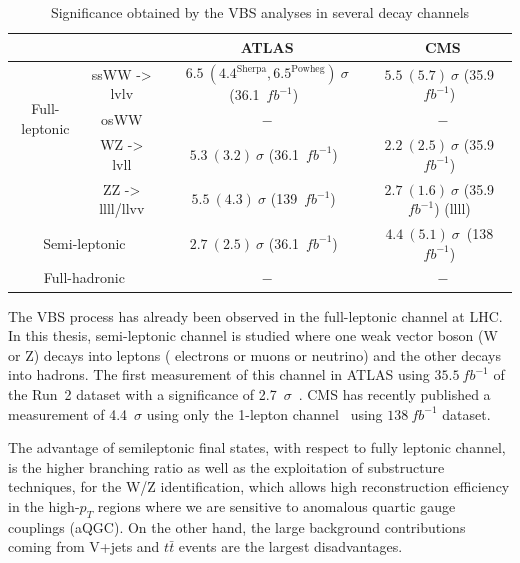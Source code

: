 \begin{center}
\begin{table}[h]
\begin{tabular}{|c|c|c|c|}
\hline \multicolumn{2}{|c|}{}                                   & ATLAS                              & CMS\\
\hline
\hline \multirow{3}{*}{ Full-leptonic }      & ssWW -> lvlv     & $6.5~(4.4^{\mathrm{Sherpa}}, 6.5^{\mathrm{Powheg}})~\sigma$ (36.1~$fb^{-1}$)~\cite{STDM-2017-06} & $5.5~(5.7)~\sigma$ (35.9~$fb^{-1}$)~\cite{CMS-SMP-21-001}  \\
\cline { 2 - 4 }                             & osWW             & $-$                                 & $-$   \\
\cline { 2 - 4 }                             & WZ -> lvll       & $5.3~(3.2)~\sigma$ (36.1~$fb^{-1}$)~\cite{STDM-2017-23} & $2.2~(2.5)~\sigma$ (35.9~$fb^{-1}$)~\cite{CMS-SMP-18-001}   \\
\cline { 2 - 4 }                             & ZZ -> llll/llvv  & $5.5~(4.3)~\sigma$ (139~$fb^{-1}$)~\cite{STDM-2017-19}  & $2.7~(1.6)~\sigma$ (35.9~$fb^{-1}$) (llll)~\cite{CMS-SMP-17-006} \\
\hline \multicolumn{2}{|c|}{ Semi-leptonic }                    & $2.7~(2.5)~\sigma$ (36.1~$fb^{-1}$)~\cite{STDM-2017-20} & $4.4~(5.1)~\sigma$~(138~$fb^{-1}$)~\cite{CMS-SMP-20-013}  \\
\hline \multicolumn{2}{|c|}{ Full-hadronic }                    & $-$                                & $-$  \\
\hline
\end{tabular}
\caption{Significance obtained by the VBS analyses in several decay channels}
\label{tab:VBSchannels}
\end{table}
\end{center}
The VBS process has already been observed in the full-leptonic channel at LHC.
In this thesis, semi-leptonic channel is studied where one weak vector boson (W or Z) decays into leptons ( electrons or muons or neutrino) and the other decays into hadrons.
The first measurement of this channel in ATLAS using $35.5~fb^{-1}$ of the Run~2 dataset with a significance of 2.7~$\sigma$~\cite{STDM-2017-20}. 
CMS has recently published a measurement of 4.4~$\sigma$ using only the 1-lepton channel~\cite{CMS-SMP-20-013} using  $138~fb^{-1}$ dataset.

The advantage of semileptonic final states, with respect to fully leptonic channel, is the higher branching ratio as well as the exploitation of 
substructure techniques, for the W/Z identification, which allows high reconstruction efficiency in the high-$p_T$ regions where we are sensitive to anomalous quartic gauge couplings (aQGC). On the other hand, the large background contributions coming from V+jets and $t\bar{t}$ events are the largest disadvantages. 

